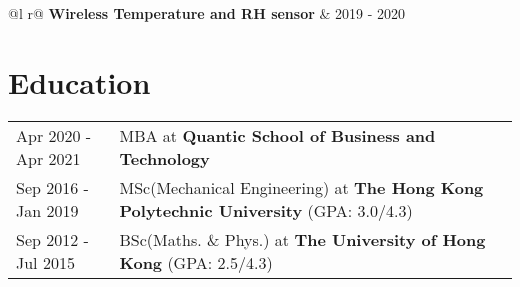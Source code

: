 \documentclass[a4paper,12pt]{article}
\begin{document}
\begin{tabularx}{\linewidth}{ @{}l r@{} }
\textbf{Wireless Temperature and RH sensor} & \hfill 2019 - 2020 \\[3.75pt]
\end{tabularx}
\section{Education}
\begin{tabularx}{\linewidth}{@{}l X@{}}	
Apr 2020 - Apr 2021 & MBA at  \textbf{Quantic School of Business and Technology} \\

Sep 2016 - Jan 2019 & MSc(Mechanical Engineering) at \textbf{The Hong Kong Polytechnic University} \hfill (GPA: 3.0/4.3) \\ 

Sep 2012 - Jul 2015 & BSc(Maths. \& Phys.) at \textbf{The University of Hong Kong} \hfill  (GPA: 2.5/4.3) \\

\end{tabularx}


\end{document}
